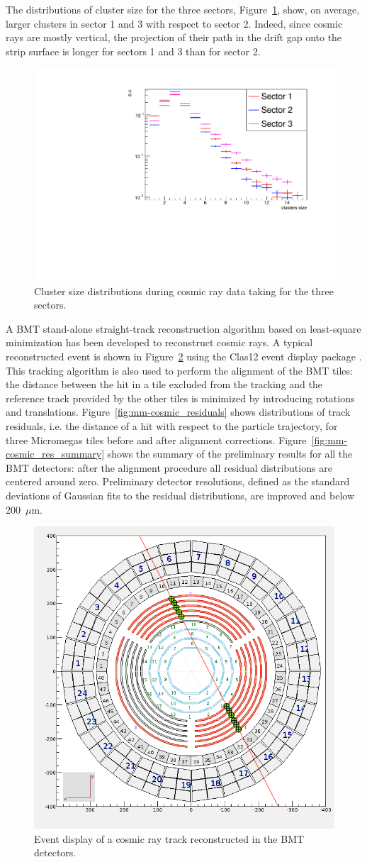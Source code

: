 The distributions of cluster size for the three sectors, Figure~\ref{fig:mm-cosmic_cls}, show, on average, larger clusters in sector 1 and 3 with respect to sector 2. Indeed, since cosmic rays are mostly vertical, the projection of their path in the drift gap onto the strip surface is longer for sectors 1 and 3 than for sector 2.

\begin{figure}[htb]
 \includegraphics[width=.45\textwidth]{images/cosmic_cluster_size.pdf}
 \caption{Cluster size distributions during cosmic ray data taking for the three sectors.}
 \label{fig:mm-cosmic_cls}
\end{figure}

A BMT stand-alone straight-track reconstruction algorithm based on least-square minimization has been developed to reconstruct cosmic rays. A typical reconstructed event is shown in Figure~\ref{fig:mm-cosmic_ced} using the Clas12 event display package \cite{nim:rec-ced}.
This tracking algorithm is also used to perform the alignment of the BMT tiles: the distance between the hit in a tile excluded from the tracking and the reference track provided by the other tiles is minimized by introducing rotations and translations. Figure~\ref{fig:mm-cosmic_residuals} shows distributions of track residuals, i.e. the distance of a hit with respect to the particle trajectory, for three Micromegas tiles before and after alignment corrections. Figure~\ref{fig:mm-cosmic_res_summary} shows the summary of the preliminary results for all the BMT detectors: after the alignment procedure all residual distributions are centered around zero. Preliminary detector resolutions, defined as the standard deviations of Gaussian fits to the residual distributions, are improved and below 200~$\mu$m. 

\begin{figure}[htb]
 \includegraphics[width=.4\textwidth]{images/cosmic_NIM.png}
 \caption{Event display of a cosmic ray track reconstructed in the BMT detectors.}
 \label{fig:mm-cosmic_ced}
\end{figure}

